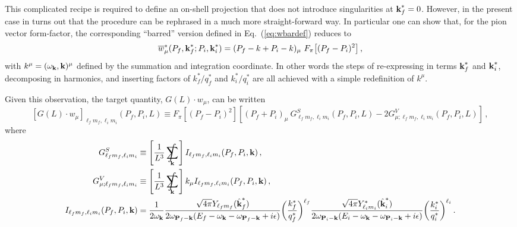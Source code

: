 This complicated recipe is required to define an on-shell projection that does not introduce singularities at $\textbf k^*_f = 0$. However, in the present case in turns out that the procedure can be rephrased in a much more straight-forward way. In particular one can show that, for the pion vector form-factor, the corresponding ``barred'' version defined in Eq.~(\ref{eq:wbardef}) reduces to
\begin{equation}
\overline w^*_\mu(P_f ,\textbf k_{f}^* ; P_i , \textbf k_{i}^*) = (P_f - k + P_i - k)_\mu \  F_\pi \big [(P_f - P_i)^2 \big ] \,,
\end{equation}
 with $k^\mu = (\omega_{\textbf k}, \textbf k)^\mu$ defined by the summation and integration coordinate. {} In other words the steps of re-expressing in terms $\textbf k_{f}^*$ and $\textbf k_{i}^*$, decomposing in harmonics, and inserting factors of $k^*_f/q^*_f$ and $k^*_i/q^*_i$ are all achieved with a simple redefinition of $k^\mu$.

Given this observation, the target quantity, $G(L) \cdot w_\mu$, can be written
\begin{equation}
\label{eq:Gdotw}
[G(L) \cdot w_\mu]_{  \ell_f m_{f},  \ell_i m_{i}}(P_f,P_i,L)  \equiv F_\pi[(P_f - P_i)^2] \left [ (P_f + P_i)_\mu  \ G^S_{ \ell_f m_{f},  \ell_i m_{i}}(P_f,P_i,L)   - 2 G^V_{\mu;  \ell_f m_{f},  \ell_i m_{i}}(P_f,P_i,L)    \right ] \,,
\end{equation}
where
\begin{align}
G_{\ell_f m_{f},  \ell_i m_{i}}^S & \equiv 
 \left[\frac{1}{L^3}\sum_{\mathbf{k}}\hspace{-.5cm}\int~\right]  I_{\ell_f m_{f},  \ell_i m_{i}}(P_f, P_i, \textbf k)
  \,,  \\
  G_{\mu; {\ell_f m_{f},  \ell_i m_{i}} }^V & \equiv 
 \left[\frac{1}{L^3}\sum_{\mathbf{k}}\hspace{-.5cm}\int~\right] k_\mu  I_{\ell_f m_{f},  \ell_i m_{i}}(P_f, P_i, \textbf k)
  \,,  \\
  I_{\ell_f m_{f},  \ell_i m_{i}}(P_f, P_i, \textbf k) & = \frac{1}{2\omega_{\textbf k}}
\frac{ \sqrt{4 \pi}  Y_{\ell_fm_{ f}}(\hat {\textbf k}^*_{f})
 }{2 \omega_{{\textbf P_f - \textbf k}}(E_f -  \omega_{\textbf k} - \omega_{\textbf P_f - \textbf k} + i \epsilon )} 
  \bigg (\frac{k^{*}_{f}}{q^*_{f}} \bigg)^{\ell_f }
\frac{ \sqrt{4 \pi}  
Y^*_{\ell_i m_{i}}(\hat {\textbf k}^*_{i})
 }{2 \omega_{\textbf P_i - \textbf k}(E_i -  \omega_{\textbf k} - \omega_{\textbf P_i - \textbf k} + i \epsilon )} 
 \bigg (\frac{k^{*}_{i}}{q^*_{i}} \bigg)^{\ell_i } \,.
\end{align}
{}



